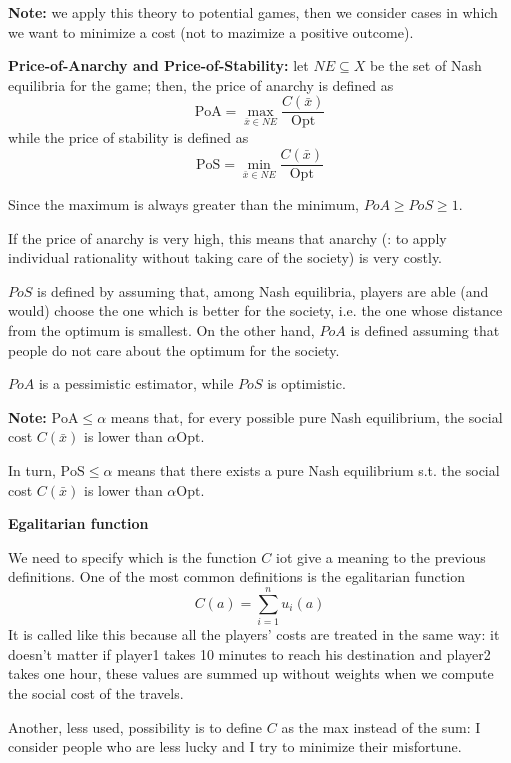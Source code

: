 \noindent \textbf{Note:} we apply this theory to potential games, then we 
consider cases in which we want to minimize a cost (not to mazimize a 
positive outcome).

\bigskip
\noindent \textbf{Price-of-Anarchy and Price-of-Stability:} let $NE \subseteq X$ be the set of Nash equilibria for the game; then, the price of anarchy is defined as
\[
	\text{PoA} = \max_{\bar{x} \in NE}{\frac{C(\bar{x})}{\text{Opt}}}
\]
while the price of stability is defined as
\[
\text{PoS} = \min_{\bar{x} \in NE}{\frac{C(\bar{x})}{\text{Opt}}}
\]

\noindent Since the maximum is always greater than the minimum, $PoA \geq PoS \geq 1$.

\noindent If the price of anarchy is very high, this means that anarchy 
(: to apply individual rationality without taking care of the society) is 
very costly. 

\noindent $PoS$ is defined by assuming that, among Nash equilibria, players 
are able (and would) choose the one which is better for the society, i.e. 
the one whose distance from the optimum is smallest. On the other hand, $PoA$ 
is defined assuming that people do not care about the optimum for the society.

\noindent $PoA$ is a pessimistic estimator, while $PoS$ is optimistic.

\noindent \textbf{Note:} $\text{PoA} \leq \alpha$ means that, for every possible pure Nash equilibrium, the social cost $C(\bar{x})$ is lower than $\alpha\text{Opt}$.

\noindent In turn, $\text{PoS} \leq \alpha$ means that there exists a pure Nash equilibrium s.t. the social cost $C(\bar{x})$ is lower than $\alpha\text{Opt}$.

\bigskip
\noindent \textbf{Egalitarian function}

\noindent We need to specify which is the function $C$ iot give a meaning 
to the previous definitions. One of the most common definitions is the 
egalitarian function
\[
	C(a) = \sum_{i=1}^{n}{u_i(a)}
\]
It is called like this because all the players' costs 
are treated in the same way: it doesn't matter if player1 takes 10 minutes 
to reach his destination and player2 takes one hour, these values are 
summed up without weights when we compute the social cost of the travels.

\noindent Another, less used, possibility is to define $C$ as the max 
instead of the sum: I consider people who are less lucky and I try to 
minimize their misfortune.

